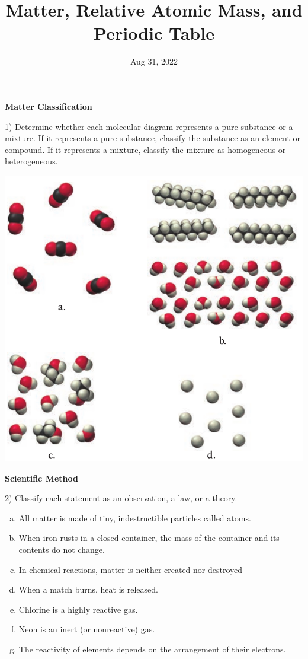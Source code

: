 \documentclass[12pt]{article}
\title{\textbf{Matter, Relative Atomic Mass, and Periodic Table}}
\date{Aug 31, 2022}
\begin{document}
\maketitle 

\textbf{Matter Classification}

1) Determine whether each molecular diagram represents a pure substance or a
mixture. If it represents a pure substance, classify the substance as an
element or compound. If it represents a mixture, classify the mixture as
homogeneous or heterogeneous.

\begin{center}
  \includegraphics[scale=0.25]{matter_classify}
\end{center}


\textbf{Scientific Method}

2) Classify each statement as an observation, a law, or a theory.
\vspace{0in}
\begin{enumerate}[a)]
\itemsep0em
\item All matter is made of tiny, indestructible particles called
  atoms.
\item When iron rusts in a closed container, the mass of the container
  and its contents do not change.
\item In chemical reactions, matter is neither created nor destroyed
\item When a match burns, heat is released.
\item Chlorine is a highly reactive gas.
\item Neon is an inert (or nonreactive) gas.
\item The reactivity of elements depends on the arrangement of their
  electrons.
\end{enumerate}
\end{document}
